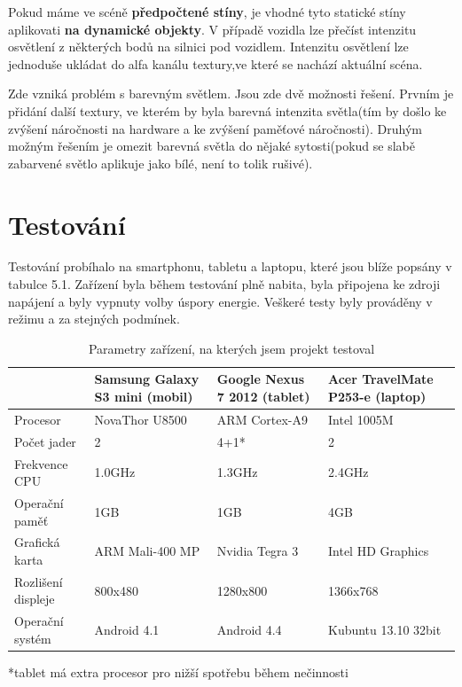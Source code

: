 \documentclass[11pt,twoside,a4paper]{book}
\begin{document}
Pokud máme ve scéně \textbf{předpočtené stíny}, je vhodné tyto statické stíny aplikovat\linebreak i \textbf{na dynamické objekty}. V případě vozidla lze přečíst intenzitu osvětlení z některých bodů na silnici pod vozidlem. Intenzitu osvětlení lze jednoduše ukládat do alfa kanálu textury,\linebreak ve které se nachází aktuální scéna.

Zde vzniká problém s barevným světlem. Jsou zde dvě možnosti řešení. Prvním je přidání další textury, ve kterém by byla barevná intenzita světla(tím by došlo ke zvýšení náročnosti na hardware a ke zvýšení paměťové náročnosti). Druhým možným řešením je omezit barevná světla do nějaké sytosti(pokud se slabě zabarvené světlo aplikuje jako bílé, není to tolik rušivé).

\chapter{Testování}
Testování probíhalo na smartphonu, tabletu a laptopu, které jsou blíže popsány v tabulce 5.1. Zařízení byla během testování plně nabita, byla připojena ke zdroji napájení a byly vypnuty volby úspory energie. Veškeré testy byly prováděny v režimu  a za stejných podmínek.

\begin{table}[h!]
\begin{center}
\begin{tabular}{|p{35mm}|p{35mm}|p{35mm}|p{35mm}|}
\hline
& \textbf{Samsung Galaxy S3 mini (mobil)} & \textbf{Google Nexus 7 2012 (tablet)} & \textbf{Acer TravelMate P253-e (laptop)} \\
\hline
Procesor & NovaThor U8500 & ARM Cortex-A9 & Intel 1005M \\ \hline
Počet jader & 2 & 4+1* & 2 \\ \hline
Frekvence CPU & 1.0GHz & 1.3GHz & 2.4GHz \\ \hline
Operační paměť & 1GB & 1GB & 4GB \\ \hline
Grafická karta & ARM Mali-400 MP & Nvidia Tegra 3 & Intel HD Graphics \\ \hline
Rozlišení displeje & 800x480 & 1280x800 & 1366x768 \\ \hline
Operační systém & Android 4.1 & Android 4.4 & Kubuntu 13.10 32bit \\ \hline
\end{tabular}
\caption{Parametry zařízení, na kterých jsem projekt testoval}
*tablet má extra procesor pro nižší spotřebu během nečinnosti
\end{center}
\end{table}
\newpage
\end{document}
